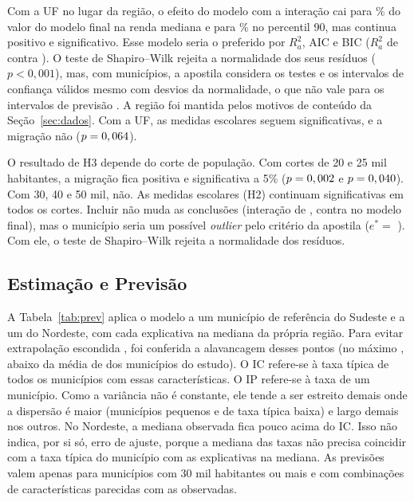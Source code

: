 \documentclass[a4paper,11pt]{article}
\begin{document}
Com a UF no lugar da região, o efeito do modelo com a interação cai para \nUFFracMed\% do valor do modelo final na renda mediana e para \nUFFracNov\% no percentil 90, mas continua positivo e significativo. Esse modelo seria o preferido por $R^2_a$, AIC e BIC ($R^2_a$ de \nRdoisAUF{} contra \nRdoisA). O teste de Shapiro--Wilk rejeita a normalidade dos seus resíduos ($p < 0{,}001$), mas, com \nMunEsc{} municípios, a apostila considera os testes e os intervalos de confiança válidos mesmo com desvios da normalidade, o que não vale para os intervalos de previsão \citep[cap.~3]{ferrari2023}. A região foi mantida pelos motivos de conteúdo da Seção~\ref{sec:dados}. Com a UF, as medidas escolares seguem significativas, e a migração não ($p = 0,064$).

O resultado de H3 depende do corte de população. Com cortes de 20 e 25 mil habitantes, a migração fica positiva e significativa a 5\% ($p = 0,002$ e $p = 0,040$). Com 30, 40 e 50 mil, não. As medidas escolares (H2) continuam significativas em todos os cortes. Incluir \nForaNome{} não muda as conclusões (interação de \nInterCJ{}, contra \nMqoInter{} no modelo final), mas o município seria um possível \textit{outlier} pelo critério da apostila ($e^* =$ \nSemiCJ). Com ele, o teste de Shapiro--Wilk rejeita a normalidade dos resíduos.


\subsection{Estimação e Previsão}

A Tabela~\ref{tab:prev} aplica o modelo a um município de referência do Sudeste e a um do Nordeste, com cada explicativa na mediana da própria região. Para evitar extrapolação escondida \citep[cap.~5]{ferrari2023}, foi conferida a alavancagem desses pontos (no máximo \nHRefMax, abaixo da média de \nHMedia{} dos municípios do estudo). O IC refere-se à taxa típica de todos os municípios com essas características. O IP refere-se à taxa de um município. Como a variância não é constante, ele tende a ser estreito demais onde a dispersão é maior (municípios pequenos e de taxa típica baixa) e largo demais nos outros. No Nordeste, a mediana observada fica pouco acima do IC. Isso não indica, por si só, erro de ajuste, porque a mediana das taxas não precisa coincidir com a taxa típica do município com as explicativas na mediana. As previsões valem apenas para municípios com 30 mil habitantes ou mais e com combinações de características parecidas com as observadas.
\end{document}
